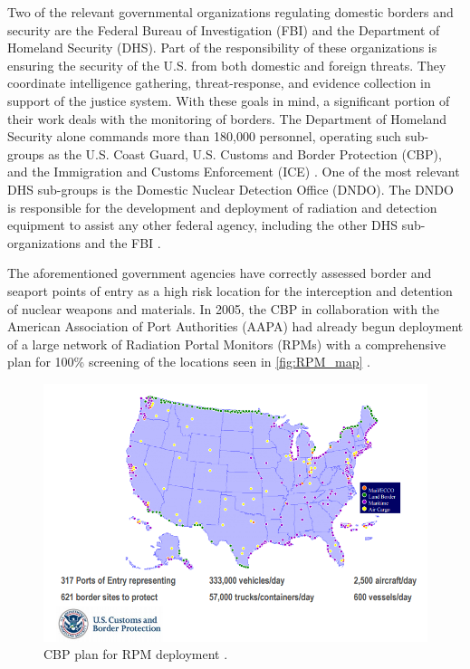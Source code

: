\documentclass{report}
\begin{document}
Two of the relevant governmental organizations regulating domestic borders and security are the Federal Bureau of Investigation (FBI) and the Department of Homeland Security (DHS). Part of the responsibility of these organizations is ensuring the security of the U.S. from both domestic and foreign threats. They coordinate intelligence gathering, threat-response, and evidence collection in support of the justice system. With these goals in mind, a significant portion of their work deals with the monitoring of borders. The Department of Homeland Security alone commands more than 180,000 personnel, operating such sub-groups as the U.S. Coast Guard, U.S. Customs and Border Protection (CBP), and the Immigration and Customs Enforcement (ICE) \cite{Robb2005}. One of the most relevant DHS sub-groups is the Domestic Nuclear Detection Office (DNDO). The DNDO is responsible for the development and deployment of radiation and detection equipment to assist any other federal agency, including the other DHS sub-organizations and the FBI \cite{UnitedStatesGovernmentAccountabilityOffice2013}. 

The aforementioned government agencies have correctly assessed border and seaport points of entry as a high risk location for the interception and detention of nuclear weapons and materials. In 2005, the CBP in collaboration with the American Association of Port Authorities (AAPA) had already begun deployment of a large network of Radiation Portal Monitors (RPMs) with a comprehensive plan for 100\% screening of the locations seen in \autoref{fig:RPM_map} \cite{Simmons2005}. 


\begin{figure}
 \centering
 \includegraphics[trim = 0cm 0cm 0cm 0cm, clip,scale=0.55]{./figures/RPM_map.png}
   \caption{CBP plan for RPM deployment \cite{Simmons2005}.}
     \label{fig:RPM_map}
\end{figure}
\end{document}
